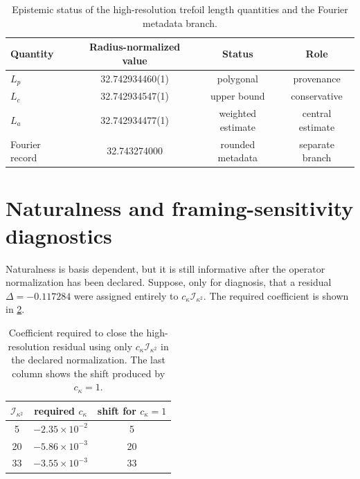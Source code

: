 \documentclass[aps,pre,preprint,notitlepage,nofootinbib,superscriptaddress]{revtex4-2}
\newcommand{\calI}{\mathcal I}
\begin{document}
\begin{table}[t]
\caption{Epistemic status of the high-resolution trefoil length quantities and the Fourier metadata branch.}
\label{tab:provenance-v020}
\begin{ruledtabular}
\scriptsize
\begin{tabular}{@{}lccc@{}}
Quantity & Radius-normalized value & Status & Role\\
\hline
$L_p$ & 32.742934460(1) & polygonal & provenance\\
$L_c$ & 32.742934547(1) & upper bound & conservative\\
$L_a$ & 32.742934477(1) & weighted estimate & central estimate\\
Fourier record & 32.743274000 & rounded metadata & separate branch\\
\end{tabular}
\end{ruledtabular}
\end{table}

\section{Naturalness and framing-sensitivity diagnostics}
\label{sec:naturalness}

Naturalness is basis dependent, but it is still informative after the operator normalization has been declared.  Suppose, only for diagnosis, that a residual $\Delta=-0.117284$ were assigned entirely to $c_\kappa\calI_{\kappa^2}$.  The required coefficient is shown in \cref{tab:naturalness-curvature}.

\begin{table}[t]
\caption{Coefficient required to close the high-resolution residual using only $c_\kappa\calI_{\kappa^2}$ in the declared normalization.  The last column shows the shift produced by $c_\kappa=1$.}
\label{tab:naturalness-curvature}
\begin{ruledtabular}
\begin{tabular}{ccc}
$\calI_{\kappa^2}$ & required $c_\kappa$ & shift for $c_\kappa=1$\\
\hline
5  & $-2.35\times10^{-2}$ & 5\\
20 & $-5.86\times10^{-3}$ & 20\\
33 & $-3.55\times10^{-3}$ & 33\\
\end{tabular}
\end{ruledtabular}
\end{table}
\end{document}
